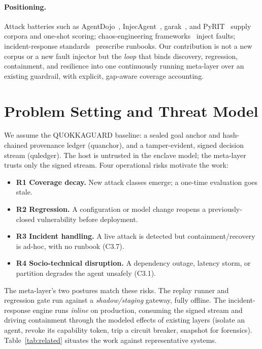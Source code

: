 \documentclass[11pt]{article}
\begin{document}
\paragraph{Positioning.} Attack batteries such as AgentDojo~\cite{agentdojo2024},
InjecAgent~\cite{injecagent2024}, garak~\cite{garak2024}, and PyRIT~\cite{pyrit}
supply corpora and one-shot scoring; chaos-engineering frameworks~\cite{chaos2016}
inject faults; incident-response standards~\cite{nistir2012} prescribe runbooks. Our
contribution is not a new corpus or a new fault injector but the \emph{loop} that
binds discovery, regression, containment, and resilience into one continuously
running meta-layer over an existing guardrail, with explicit, gap-aware coverage
accounting.

\section{Problem Setting and Threat Model}
We assume the QUOKKAGUARD baseline: a sealed goal anchor and hash-chained provenance
ledger (quanchor), and a tamper-evident, signed decision stream (quledger). The host is
untrusted in the enclave model; the meta-layer trusts only the signed stream. Four
operational risks motivate the work:

\begin{itemize}
  \item \textbf{R1 Coverage decay.} New attack classes emerge; a one-time evaluation
  goes stale.
  \item \textbf{R2 Regression.} A configuration or model change reopens a
  previously-closed vulnerability before deployment.
  \item \textbf{R3 Incident handling.} A live attack is detected but
  containment/recovery is ad-hoc, with no runbook (C3.7).
  \item \textbf{R4 Socio-technical disruption.} A dependency outage, latency storm,
  or partition degrades the agent unsafely (C3.1).
\end{itemize}

The meta-layer's two postures match these risks. The replay runner and regression
gate run against a \emph{shadow/staging} gateway, fully offline. The
incident-response engine runs \emph{inline} on production, consuming the signed
stream and driving containment through the modeled effects of existing layers
(isolate an agent, revoke its capability token, trip a circuit breaker, snapshot for
forensics). Table~\ref{tab:related} situates the work against representative systems.
\end{document}
